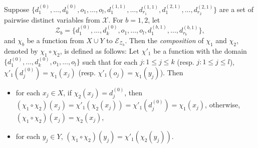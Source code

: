 \documentclass[runningheads,a4paper]{llncs}
\def\Ee{{\mathcal{E} }}
\def\Zz{{\mathcal{Z} }}
\newcommand\intvars{\mathcal{X}}
\newcommand{\hide}[1]{}
\begin{document}
\hide{\\
	
$^P_3 d^{y_j}_{j'}$	

$d^{P,y_j,3}_{{\pi^P}^{-1}(j')}$
$d(P,y_j,3)_{{\pi(P)}^{-1}(j')}$
$^P_3{\mathfrak{d}^j_{j'}}$
$\prescript{P}{3}{\mathfrak{d}^j_{j'}}$
\newcommand\va{\mathfrak{a}}
\newcommand\vb{\mathfrak{b}}
\newcommand\vd{\mathfrak{d}}


	
\begin{proposition}\label{prop-sum-path}
	The values of the control and data variables after traversing the path $P$ are specified by a function $\chi^P$ satisfying the following conditions.
	\begin{itemize}
		\item There is an injective mapping $\pi^P: \{1,\dots,k\} \rightarrow \{1,\dots, k+r_P\}$ such that for each $x_j \in X$, if $\pi^P(j) \le k$, then $\pi^P(j)=j$ and $\chi^P(x_j)=\vb_{j}$, otherwise, $\chi(x_j)=\vd_{\pi^P(j)-k}$.
		\item For each $y_j \in Y$, $\chi^P(y_j) = {c}^P + a^P\va^P + b^{P,y_j}_{1} \vb^P_1 + \dots + b^{P,y_j}_{k} \vb_k + d_{j,1} \vd_1 +\dots + d_{j,r_P} \vd_{r_P}$ for such that $a \in \{0,+1\}$ (as a result of the ``independently evolving and copyless'' constraint).
		
		\item test for cycles: $\chi^{C^3}(y_j) = {c}^{C^3} + a^{C^3}\va^{C^3} + b^{{C^3},y_j}_{1} \vb^{C^3}_1 + \dots + b^{{C^3},y_j}_{k} \vb_k + d_{j,1} \vd_1 +\dots + d_{j,r_C} \vd_{r_C}$
	\end{itemize}
\end{proposition}	



}


Suppose $\{d^{(0)}_1,\dots,d^{(0)}_k, o_1,\dots,o_l, d^{(1,1)}_1,\dots,d^{(1,1)}_{r_1}, d^{(2,1)}_1,\dots,d^{(2,1)}_{r_2}\}$ are a set of pairwise distinct variables from $\intvars$. For $b=1,2$, let 
\[\Zz_b=\{d^{(0)}_1,\dots,d^{(0)}_k, o_1,\dots,o_l, d^{(b,1)}_1,\dots,d^{(b,1)}_{r_b}\},\] and $\chi_b$ be a function from $X \cup Y$ to $\Ee_{\mathcal{Z}_b}$. Then the \emph{composition} of $\chi_1$ and $\chi_2$, denoted by $\chi_1 \circ \chi_2$, is defined as follows: Let $\chi'_1$ be a function with the domain $\{d^{(0)}_1,\dots,d^{(0)}_k, o_1,\dots,o_l\}$ such that for each $j: 1 \le j \le k$ (resp. $j: 1 \le j \le l$), $\chi'_1(d^{(0)}_j)=\chi_1(x_j)$ (resp. $\chi'_1(o_j)=\chi_1(y_j)$). Then
\begin{itemize}
\item for each $x_j \in X$, if $\chi_2(x_j) = d^{(0)}_j$, then $(\chi_1 \circ \chi_2)(x_j)=\chi'_1(\chi_2(x_j)) = \chi'_1(d^{(0)}_j)=\chi_1(x_j)$, otherwise, $(\chi_1 \circ \chi_2)(x_j)=\chi_2(x_j)$,
%
\item for each $y_j \in Y$, $(\chi_1 \circ \chi_2)(y_j)=\chi'_1(\chi_2(y_j))$.
\end{itemize}
\end{document}

